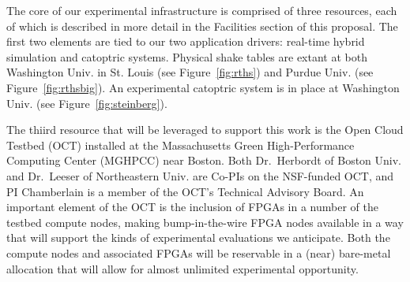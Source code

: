 The core of our experimental infrastructure is comprised of three resources, each of which is described in more detail in the Facilities section of this proposal.  The first two elements are tied to our two application drivers: real-time hybrid simulation and catoptric systems.
Physical shake tables are extant at both Washington Univ. in St. Louis (see Figure~\ref{fig:rths}) and Purdue Univ. (see Figure~\ref{fig:rthsbig}). An experimental catoptric system is in place at Washington Univ. (see Figure~\ref{fig:steinberg}).

The thiird resource that will be leveraged to support this work is the Open Cloud Testbed (OCT) installed at the Massachusetts Green High-Performance Computing Center (MGHPCC) near Boston. Both Dr.~Herbordt of Boston Univ. and Dr.~Leeser of Northeastern Univ. are Co-PIs on the NSF-funded OCT, and PI Chamberlain is a member of the OCT's Technical Advisory Board. An important element of the OCT is the inclusion of FPGAs in a number of the testbed compute nodes, making bump-in-the-wire FPGA nodes available in a way that will support the kinds of experimental evaluations we anticipate.  Both the compute nodes and associated FPGAs will be reservable in a (near) bare-metal allocation that will allow for almost unlimited experimental opportunity.